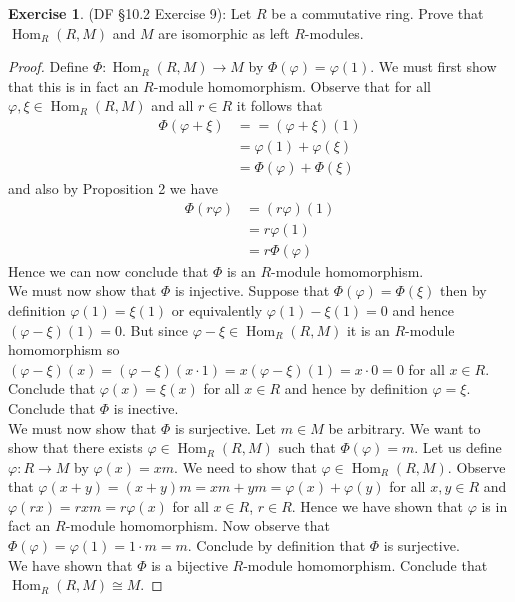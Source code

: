 \documentclass[8pt]{amsart}
\theoremstyle{plain}%
\theoremstyle{definition}
\newtheorem*{exercise}{Exercise}%
\theoremstyle{remark}
\numberwithin{equation}{section}
\begin{document}
\begin{exercise}
(DF \S 10.2 Exercise 9): Let $R$ be a commutative ring. Prove that $\operatorname{Hom}_R(R, M)$ and $M$ are isomorphic as left $R$-modules.
	\begin{proof}
		Define $\Phi : \operatorname{Hom}_R(R, M) \to M$ by $\Phi(\varphi) = \varphi(1)$. We must first show that this is in fact an $R$-module homomorphism. Observe that for all $\varphi, \xi \in \operatorname{Hom}_R(R, M)$ and all $r \in R$ it follows that
		\begin{align*}
			\Phi(\varphi + \xi) &= = (\varphi + \xi)(1)\\
			&= \varphi(1) + \varphi(\xi)\\
			&= \Phi(\varphi) + \Phi(\xi) 
		\end{align*}
		and also by Proposition 2 we have
		\begin{align*}
			\Phi(r\varphi) &= (r\varphi)(1)\\
			&= r \varphi(1)\\
			&= r \Phi(\varphi)
		\end{align*}
		Hence we can now conclude that $\Phi$ is an $R$-module homomorphism.\\

		We must now show that $\Phi$ is injective. Suppose that $\Phi(\varphi) = \Phi(\xi)$ then by definition $\varphi(1) = \xi(1)$ or equivalently $\varphi(1) - \xi(1) = 0$ and hence $(\varphi - \xi)(1) = 0$. But since $\varphi - \xi \in \operatorname{Hom}_R(R, M)$ it is an $R$-module homomorphism so $(\varphi - \xi)(x) = (\varphi - \xi)(x \cdot 1) = x(\varphi - \xi)(1) = x \cdot 0 = 0$ for all $x \in R$. Conclude that $\varphi(x) = \xi(x)$ for all $x \in R$ and hence by definition $\varphi = \xi$. Conclude that $\Phi$ is inective.\\

		We must now show that $\Phi$ is surjective. Let $m \in M$ be arbitrary. We want to show that there exists $\varphi \in \operatorname{Hom}_R(R, M)$ such that $\Phi(\varphi) = m$. Let us define $\varphi : R \to M$ by $\varphi(x) = xm$. We need to show that $\varphi \in \operatorname{Hom}_R(R, M)$. Observe that $\varphi(x + y) = (x + y)m = xm + ym = \varphi(x) + \varphi(y)$ for all $x, y \in R$ and $\varphi(rx) = rxm = r \varphi(x)$ for all $x \in R$, $r \in R$. Hence we have shown that $\varphi$ is in fact an $R$-module homomorphism. Now observe that $\Phi(\varphi) = \varphi(1) = 1 \cdot m = m$. Conclude by definition that $\Phi$ is surjective.\\

	We have shown that $\Phi$ is a bijective $R$-module homomorphism. Conclude that $\operatorname{Hom}_R(R, M) \cong M$.	
	\end{proof}
\end{exercise}
\end{document}
